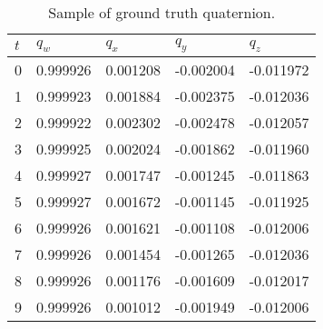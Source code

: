 \documentclass[12pt, titlepage]{article}
\begin{document}
\begin{landscape}
\begin{table}[]
\caption{Sample of ground truth quaternion.}
\label{tab:gt_label}
\centering
\begin{tabular}{|l||l|l|l|l|} \hline
$t$ & $q_w$ & $q_x$ & $q_y$ & $q_z$ \\ \hline
\hline
0&0.999926 & 0.001208 & -0.002004 & -0.011972 \\ \hline
1&0.999923 & 0.001884 & -0.002375 & -0.012036 \\\hline
2&0.999922 & 0.002302 & -0.002478 & -0.012057 \\\hline
3&0.999925 & 0.002024 & -0.001862 & -0.011960 \\\hline
4&0.999927 & 0.001747 & -0.001245 & -0.011863 \\\hline
5&0.999927 & 0.001672 & -0.001145 & -0.011925 \\\hline
6&0.999926 & 0.001621 & -0.001108 & -0.012006 \\\hline
7&0.999926 & 0.001454 & -0.001265 & -0.012036 \\\hline
8&0.999926 & 0.001176 & -0.001609 & -0.012017 \\\hline
9&0.999926 & 0.001012 & -0.001949 & -0.012006 \\ \hline
\end{tabular}
\end{table}


\end{landscape}
\end{document}
